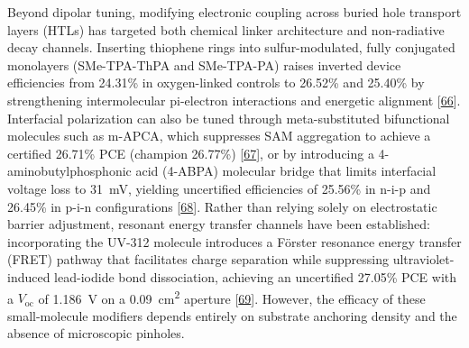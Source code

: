 \documentclass[
  11pt,
]{article}
\begin{document}
Beyond dipolar tuning, modifying electronic coupling across buried hole
transport layers (HTLs) has targeted both chemical linker architecture
and non-radiative decay channels. Inserting thiophene rings into
sulfur-modulated, fully conjugated monolayers (SMe-TPA-ThPA and
SMe-TPA-PA) raises inverted device efficiencies from 24.31\% in
oxygen-linked controls to 26.52\% and 25.40\% by strengthening
intermolecular pi-electron interactions and energetic alignment
{[}\href{https://doi.org/10.1002/anie.5319815}{66}{]}. Interfacial
polarization can also be tuned through meta-substituted bifunctional
molecules such as m-APCA, which suppresses SAM aggregation to achieve a
certified 26.71\% PCE (champion 26.77\%)
{[}\href{https://doi.org/10.1002/adma.73306}{67}{]}, or by introducing a
4-aminobutylphosphonic acid (4-ABPA) molecular bridge that limits
interfacial voltage loss to \qty{31}{\milli\volt}, yielding uncertified
efficiencies of 25.56\% in n-i-p and 26.45\% in p-i-n configurations
{[}\href{https://doi.org/10.1002/adma.202519267}{68}{]}. Rather than
relying solely on electrostatic barrier adjustment, resonant energy
transfer channels have been established: incorporating the UV-312
molecule introduces a Förster resonance energy transfer (FRET) pathway
that facilitates charge separation while suppressing ultraviolet-induced
lead-iodide bond dissociation, achieving an uncertified 27.05\% PCE with
a \(V_\mathrm{oc}\) of \qty{1.186}{\volt} on a
\qty{0.09}{\centi\meter\squared} aperture
{[}\href{https://doi.org/10.1002/anie.3596437}{69}{]}. However, the
efficacy of these small-molecule modifiers depends entirely on substrate
anchoring density and the absence of microscopic pinholes.
\end{document}
